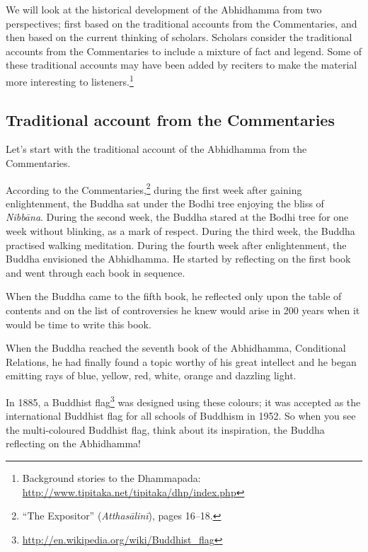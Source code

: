 \pagebreak

We will look at the historical development of the Abhidhamma from two perspectives; first based on the traditional accounts from the Commentaries, and then based on the current thinking of scholars. Scholars consider the traditional accounts from the Commentaries to include a mixture of fact and legend. Some of these traditional accounts may have been added by reciters to make the material more interesting to listeners.\footnote{Background stories to the Dhammapada: \url{http://www.tipitaka.net/tipitaka/dhp/index.php}}

\subsection*{Traditional account from the Commentaries}

Let’s start with the traditional account of the Abhidhamma from the Commentaries. 

According to the Commentaries,\footnote{“The Expositor” (\textit{Atthasālinī}), pages 16--18.} during the first week after gaining enlightenment, the Buddha sat under the Bodhi tree enjoying the bliss of \textit{Nibbāna}. During the second week, the Buddha stared at the Bodhi tree for one week without blinking, as a mark of respect. During the third week, the Buddha practised walking meditation. During the fourth week after enlightenment, the Buddha envisioned the Abhidhamma. He started by reflecting on the first book and went through each book in sequence. 

When the Buddha came to the fifth book, he reflected only upon the table of contents and on the list of controversies he knew would arise in 200 years when it would be time to write this book. 

When the Buddha reached the seventh book of the Abhidhamma, Conditional Relations, he had finally found a topic worthy of his great intellect and he began emitting rays of blue, yellow, red, white, orange and dazzling light. 

In 1885, a Buddhist flag\footnote{\url{http://en.wikipedia.org/wiki/Buddhist_flag}} was designed using these colours; it was accepted as the international Buddhist flag for all schools of Buddhism in 1952. So when you see the multi-coloured Buddhist flag, think about its inspiration, the Buddha reflecting on the Abhidhamma!

